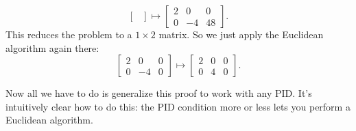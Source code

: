 \begin{example}
\[\begin{bmatrix}
		\end{bmatrix}
		\mapsto
		\begin{bmatrix}
			2 & 0 & 0 \\
			0 & -4 & 48
		\end{bmatrix}.
	\]
	This reduces the problem to a $1 \times 2$ matrix.
	So we just apply the Euclidean algorithm again there:
	\[
		\begin{bmatrix}
			2 & 0 & 0 \\
			0 & -4 & 0
		\end{bmatrix}
		\mapsto
		\begin{bmatrix}
			2 & 0 & 0 \\
			0 & 4 & 0
		\end{bmatrix}.
	\]
\end{example}

Now all we have to do is generalize this proof to work
with any PID. It's intuitively clear how to do this:
the PID condition more or less lets you perform a Euclidean algorithm.

